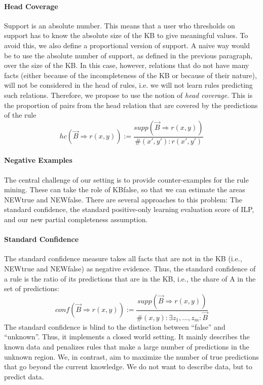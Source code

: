\paragraph{Head Coverage} %
Support is an absolute number. This means that a user who thresholds on support has to know the absolute size of the KB to give meaningful values. 
To avoid this, we also define a proportional version of support. A naive way would be to use the absolute number of support, as defined in the previous paragraph, over the size of the KB. 
In this case, however, relations that do not have many facts (either because of the incompleteness of the KB or because of their nature), will not be considered in the head of rules,
i.e. we will not learn rules predicting such relations. Therefore, we propose to use the notion of \emph{head coverage}. 
This is the proportion of pairs from the head relation that are covered by the predictions of the rule
\[hc(\vec{B} \Rightarrow r(x,y)) := \frac{supp(\vec{B} \Rightarrow r(x,y))}{\#(x',y') : r(x',y')}\]

\paragraph{Negative Examples} The central challenge of our setting is to provide counter-examples for the rule mining. These can take the role of KBfalse, so that we can estimate the areas NEWtrue and NEWfalse. There are several approaches to this problem: The standard confidence, the standard positive-only learning evaluation score of ILP, and our new partial completeness assumption.

\paragraph{Standard Confidence} The standard confidence measure takes all facts that are not in the KB (i.e., NEWtrue and NEWfalse) as negative evidence. Thus, the standard confidence of a rule is the ratio of its predictions that are in the KB, i.e., the share of A in the set of predictions:
\[conf(\vec{B} \Rightarrow r(x,y)) := \frac{supp(\vec{B} \Rightarrow r(x,y))}{\#(x,y): \exists z_1,...,z_m: \vec{B}}\]
The standard confidence is blind to the distinction between ``false'' and ``unknown''. Thus, it implements a closed world setting. It mainly describes the known data and penalizes rules that make a large number of predictions in the unknown region. We, in contrast, aim to maximize the number of true predictions that go beyond the current knowledge. We do not want to describe data, but to predict data.

